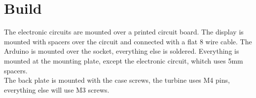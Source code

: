 \section{Build}
    The electronic circuits are mounted over a printed circuit board. The display is  mounted with spacers over the circuit and connected with a flat 8 wire cable. The Arduino is mounted over the socket, everything else is soldered. Everything is mounted at the mounting plate, except the electronic circuit, whitch uses 5mm spacers.\\
    The back plate is mounted with the case screws, the turbine uses M4 pins, everything else will use M3 screws. 
